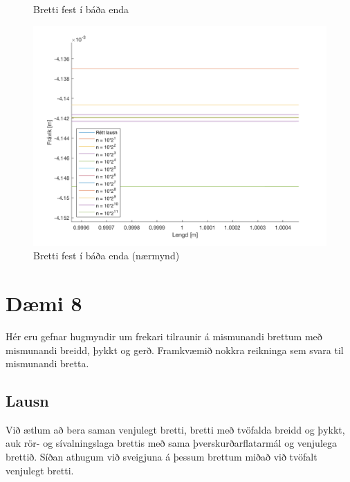\documentclass[11pt]{article}
\begin{document}
{\begin{figure}[H]
\caption{Bretti fest í báða enda}
\end{figure}
\begin{figure}[H]
\centering
\includegraphics[scale=0.3]{britch_close.png}
\caption{Bretti fest í báða enda (nærmynd)}
\end{figure}








\newpage
\section*{Dæmi 8}

Hér eru gefnar hugmyndir um frekari tilraunir á mismunandi brettum með mismunandi breidd, þykkt og gerð. Framkvæmið nokkra reikninga sem svara til mismunandi bretta.

\subsection*{Lausn}

Við ætlum að bera saman venjulegt bretti, bretti með tvöfalda breidd og þykkt, auk rör- og sívalningslaga brettis með sama þverskurðarflatarmál og venjulega brettið. Síðan athugum við sveigjuna á þessum brettum miðað við tvöfalt venjulegt bretti. 

}
\end{document}
